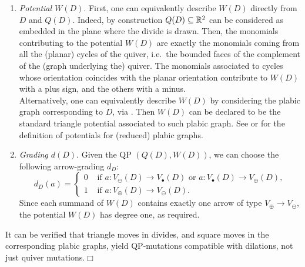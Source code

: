 \begin{enumerate}

    \item {\it Potential $W(D)$}. First, one can equivalently describe $W(D)$ directly from $D$ and $Q(D)$. Indeed, by construction $Q(D)\subseteq\mathbb R^2$ can be considered as embedded in the plane where the divide is drawn. Then, the monomials contributing to the potential $W(D)$ are exactly the monomials coming from all the (planar) cycles of the quiver, i.e.~the bounded faces of the complement of the (graph underlying the) quiver. The monomials associated to cycles whose orientation coincides with the planar orientation contribute to $W(D)$ with a plus sign, and the others with a minus.\\

 \noindent   Alternatively, one can equivalently describe $W(D)$ by considering the plabic graph corresponding to $D$, via \cite[Definition 6.11]{FPST}. Then $W(D)$ can be declared to be the standard triangle potential associated to such plabic graph. See \cite[Definition 2.4]{Pressland19} or \cite[Remark 3.6]{BKM13} for the definition of potentials for (reduced) plabic graphs.\\
    
    \item {\it Grading $d(D)$}. Given the QP $(Q(D),W(D))$, we can choose the following arrow-grading $d_D$:
    \begin{equation}\label{eq:canonical-divide-grading}
 d_D(a)=
 \begin{cases}
 0&\mbox{ if }a:V_\ominus(D)\to V_\bullet(D)
       \text{ or }a:V_\bullet(D)\to V_\oplus(D),\\
 1&\mbox{ if }a:V_\oplus(D)\to V_\ominus(D).
 \end{cases}
\end{equation}
Since each summand of $W(D)$ contains exactly one arrow of type
\(V_\oplus\to V_\ominus\), the potential $W(D)$ has degree one, as required.
\end{enumerate}

\begin{remark}
It can be verified that triangle moves in divides, and square moves in the corresponding plabic graphs, yield QP-mutations compatible with dilations, not just quiver mutations.\hfill$\Box$
\end{remark}